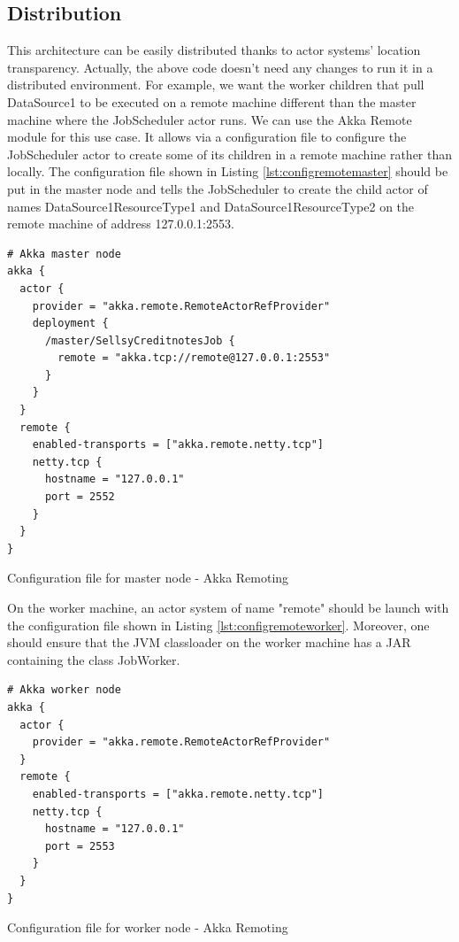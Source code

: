 \subsection{Distribution}

This architecture can be easily distributed thanks to actor systems' location transparency. Actually, the above code doesn't need any changes to run it in a distributed
environment. 
For example, we want the worker children that pull DataSource1 to be executed on a remote machine different than the master machine where the JobScheduler actor runs.
We can use the Akka Remote module  for this use case. It allows via a configuration file to configure the JobScheduler actor to create some
of its children in a remote machine rather than locally. The configuration file shown in Listing \ref{lst:configremotemaster} should be put in the master node and 
tells the JobScheduler to create the child actor of names DataSource1ResourceType1 and DataSource1ResourceType2 on the remote machine of address 127.0.0.1:2553.

\begin{listing}[h]
\begin{verbatim}
# Akka master node
akka {
  actor {
    provider = "akka.remote.RemoteActorRefProvider"
    deployment {
      /master/SellsyCreditnotesJob {
        remote = "akka.tcp://remote@127.0.0.1:2553"
      }
    }
  }
  remote {
    enabled-transports = ["akka.remote.netty.tcp"]
    netty.tcp {
      hostname = "127.0.0.1"
      port = 2552
    }
  }
}
\end{verbatim}
\caption{Configuration file for master node - Akka Remoting}
\label{lst:configremotemaster}
\end{listing}

On the worker machine, an actor system of name "remote" should be launch with the configuration file shown in Listing \ref{lst:configremoteworker}. Moreover,
one should ensure that the JVM classloader on the worker machine has a JAR containing the class JobWorker.

\begin{listing}[h]
\begin{verbatim}
# Akka worker node
akka {
  actor {
    provider = "akka.remote.RemoteActorRefProvider"
  }
  remote {
    enabled-transports = ["akka.remote.netty.tcp"]
    netty.tcp {
      hostname = "127.0.0.1"
      port = 2553
    }
  }
}  
\end{verbatim}
\caption{Configuration file for worker node - Akka Remoting}
\label{lst:configremoteworker}
\end{listing}

